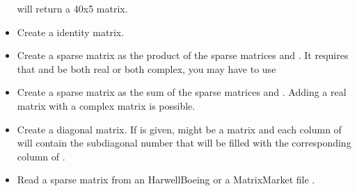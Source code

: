 \documentclass[a4paper,11pt,english]{sphinxmanual}
\begin{document}
\begin{fulllineitems}
\begin{itemize}
\begin{sphinxVerbatim}[commandchars=\\\{\}]
     \PYG{p}{[}    \PYG{p}{]}
\end{sphinxVerbatim}

will return a 40x5 matrix.

\item {} 
Create a  identity matrix.

\item {} 
Create a sparse matrix as the product of the sparse matrices  and
. It requires that  and  be both real or both complex, you
may have to use 

\item {} 
Create a sparse matrix as the sum of the sparse matrices  and .
Adding a real matrix with a complex matrix is possible.

\item {} 
Create a diagonal matrix. If  is given,  might be a matrix and
each column of  will contain the sub\sphinxhyphen{}diagonal number that will be
filled with the corresponding column of .

\item {} 
Read a sparse matrix from an Harwell\sphinxhyphen{}Boeing or a Matrix\sphinxhyphen{}Market file
.


\end{itemize}
\end{fulllineitems}
\end{document}
